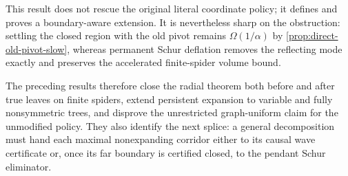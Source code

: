 This result does not rescue the original literal coordinate policy; it
defines and proves a boundary-aware extension.  It is nevertheless sharp on
the obstruction: settling the closed region with the old pivot remains
$\Omega(1/\alpha)$ by \cref{prop:direct-old-pivot-slow}, whereas permanent
Schur deflation removes the reflecting mode exactly and preserves the
accelerated finite-spider volume bound.

The preceding results therefore close the radial theorem both before and
after true leaves on finite spiders, extend persistent expansion to variable
and fully nonsymmetric trees, and disprove the unrestricted graph-uniform
claim for the unmodified policy.  They also identify the next splice: a
general decomposition must hand each maximal nonexpanding corridor either to
its causal wave certificate or, once its far boundary is certified closed,
to the pendant Schur eliminator.
